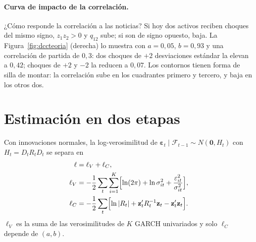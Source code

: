\paragraph{Curva de impacto de la correlación.} ¿Cómo responde la correlación a las noticias? Si hoy dos activos
reciben choques del mismo signo, $z_{1}z_{2}>0$ y $q_{12}$ sube; si son de signo opuesto, baja. La
Figura~\ref{fig:dccteoria} (derecha) lo muestra con $a=0{,}05$, $b=0{,}93$ y una correlación de partida de
$0{,}3$: dos choques de $+2$ desviaciones estándar la elevan a $0{,}42$; choques de $+2$ y $-2$ la reducen a $0{,}07$.
Los contornos tienen forma de silla de montar: la correlación sube en los cuadrantes primero y tercero, y baja en
los otros dos.

\section{Estimación en dos etapas}

\begin{proposicion}\label{prop:dccll}
Con innovaciones normales, la log-verosimilitud de $\boldsymbol\varepsilon_t\mid\mathcal F_{t-1}\sim N(\mathbf 0,H_t)$
con $H_t=D_tR_tD_t$ se separa en
\begin{align*}
  \ell &= \ell_V+\ell_C,\\
  \ell_V &= -\frac12\sum_{t}\sum_{i=1}^{K}\Bigl[\ln(2\pi)+\ln\sigma_{it}^2+\frac{\varepsilon_{it}^2}{\sigma_{it}^2}\Bigr],\\
  \ell_C &= -\frac12\sum_{t}\Bigl[\ln|R_t|+\mathbf z_t'R_t^{-1}\mathbf z_t-\mathbf z_t'\mathbf z_t\Bigr].
\end{align*}
$\ell_V$ es la suma de las verosimilitudes de $K$ GARCH univariados y solo $\ell_C$ depende de $(a,b)$.
\end{proposicion}

